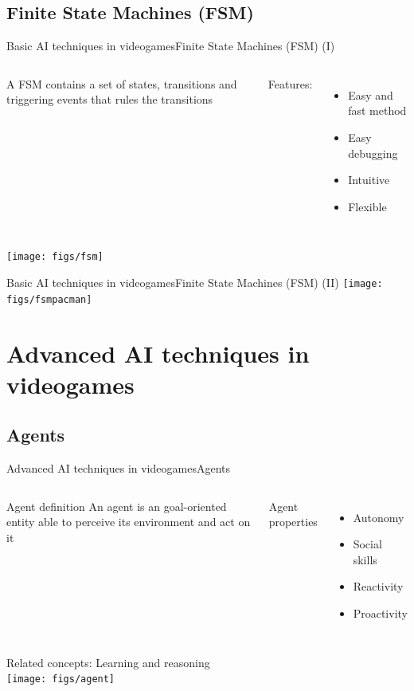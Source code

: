 \documentclass[10pt,compress]{beamer} %
\begin{document}
\subsection{Finite State Machines (FSM)}
\begin{frame}{Basic AI techniques in videogames}{Finite State Machines (FSM) (I)}
    \begin{columns}
	   \begin{block}{}
	   	A FSM contains a set of states, transitions and triggering events that rules the transitions
		\end{block}
		Features:
		\begin{itemize}
		\item Easy and fast method
		\item Easy debugging
		\item Intuitive
		\item Flexible
		\end{itemize}
	\end{columns}
	\vspace{0.5cm}
		\centering\texttt{[image: figs/fsm]}\\
\end{frame}

\begin{frame}{Basic AI techniques in videogames}{Finite State Machines (FSM) (II)}
		\centering\texttt{[image: figs/fsmpacman]}\\
\end{frame}

\section{Advanced AI techniques in videogames}
\subsection{Agents}
\begin{frame}{Advanced AI techniques in videogames}{Agents}
    \begin{columns}
	   \vspace{-0.8cm}
		\begin{block}{Agent definition}
		An agent is an goal-oriented entity able to perceive its environment and act on it
		\end{block}
		Agent properties
		\begin{itemize}
		\item Autonomy
		\item Social skills
		\item Reactivity
		\item Proactivity
		\end{itemize}
	\end{columns}
		Related concepts: Learning and reasoning\\
		\vspace{0.5cm}
		\centering\texttt{[image: figs/agent]}\\
\end{frame}
\end{document}
